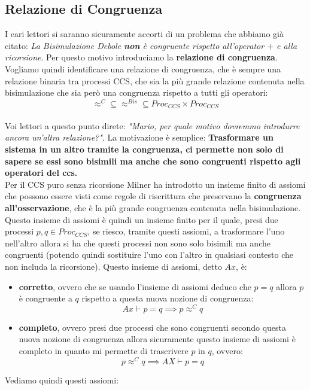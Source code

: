 \subsection{Relazione di Congruenza}
I cari lettori si saranno sicuramente accorti di un problema che abbiamo già citato: \textit{La Bisimulazione Debole \textbf{non} è congruente rispetto all'operator $+$ e alla ricorsione}. Per questo motivo introduciamo la \textbf{relazione di congruenza}.
Vogliamo quindi identificare una relazione di congruenza, che è sempre una
relazione binaria tra processi CCS, che sia la più grande relazione contenuta
nella bisimulazione che sia però una congruenza rispetto a tutti gli
operatori:
\[\approx^C\subseteq\approx^{Bis}\subseteq Proc_{CCS}\times Proc_{CCS}\]\\
Voi lettori a questo punto direte: \textit{"Mario, per quale motivo dovremmo introdurre ancora un'altra relazione?"}. La motivazione è semplice: \textbf{Trasformare un sistema in un altro tramite la congruenza, ci permette non solo di sapere se essi sono bisimili ma anche che sono congruenti rispetto agli operatori del ccs.}\\
Per il CCS puro senza ricorsione Milner ha introdotto un insieme
finito di assiomi che possono essere visti come regole di riscrittura che
preservano la \textbf{congruenza all'osservazione}, che è la più grande
congruenza contenuta nella bisimulazione. Questo insieme di assiomi è quindi un
insieme finito per il quale, presi due processi $p, q\in Proc_{CCS}$, se riesco,
tramite questi assiomi, a trasformare l'uno nell'altro allora si ha che questi
processi non sono solo bisimili ma anche congruenti (potendo quindi sostituire
l'uno con l'altro in qualsiasi contesto che non includa la ricorsione). Questo
insieme di assiomi, detto $Ax$, è:
\begin{itemize}
  \item \textbf{corretto}, ovvero che se usando l'insieme di assiomi deduco che
  $p=q$ allora $p$ è congruente a $q$ rispetto a questa nuova nozione di
  congruenza:
  \[Ax\vdash p=q\implies p\approx^C q\]
  \item \textbf{completo}, ovvero presi due processi che sono congruenti secondo
  questa nuova nozione di congruenza allora sicuramente questo insieme di
  assiomi è completo in quanto mi permette di trascrivere $p$ in
  $q$, ovvero:
  \[p\approx^C q\implies AX\vdash p=q\]
\end{itemize}
Vediamo quindi questi assiomi:
